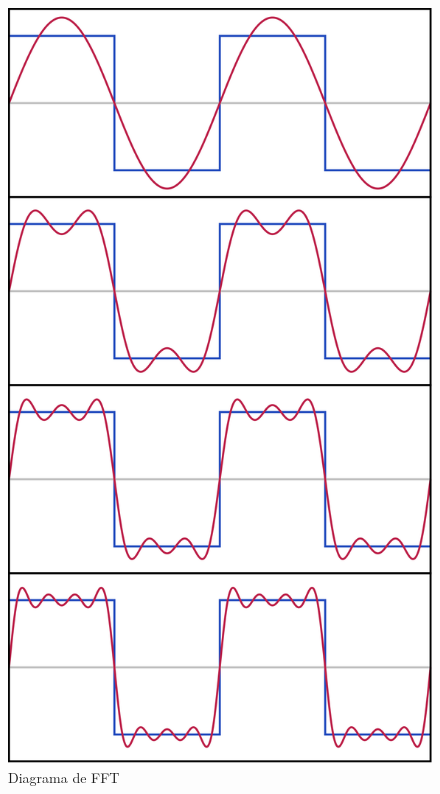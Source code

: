 \documentclass{report}
\begin{document}
\begin{figure}
        \includegraphics[scale=0.1]{Images/fourier2.png}
        \caption{Diagrama de FFT}
\end{figure}
\end{document}
